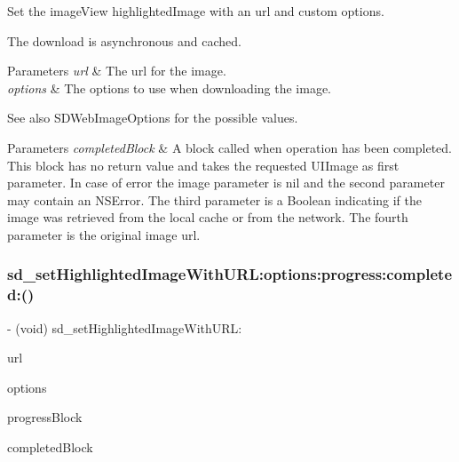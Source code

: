 Set the image\+View {\ttfamily highlighted\+Image} with an {\ttfamily url} and custom options.

The download is asynchronous and cached.


\begin{DoxyParams}{Parameters}
{\em url} & The url for the image. \\
\hline
{\em options} & The options to use when downloading the image. \\
\hline
\end{DoxyParams}
\begin{DoxySeeAlso}{See also}
S\+D\+Web\+Image\+Options for the possible values. 
\end{DoxySeeAlso}

\begin{DoxyParams}{Parameters}
{\em completed\+Block} & A block called when operation has been completed. This block has no return value and takes the requested U\+I\+Image as first parameter. In case of error the image parameter is nil and the second parameter may contain an N\+S\+Error. The third parameter is a Boolean indicating if the image was retrieved from the local cache or from the network. The fourth parameter is the original image url. \\
\hline
\end{DoxyParams}
\mbox{\label{category_u_i_image_view_07_highlighted_web_cache_08_a06bdae01c3cfc17896de4b8d3c33702d}} 
\subsubsection{\texorpdfstring{sd\+\_\+set\+Highlighted\+Image\+With\+U\+R\+L\+:options\+:progress\+:completed\+:()}{sd\_setHighlightedImageWithURL:options:progress:completed:()}\hspace{0.1cm}{\footnotesize\ttfamily [1/3]}}
{\footnotesize\ttfamily -\/ (void) sd\+\_\+set\+Highlighted\+Image\+With\+U\+R\+L\+: \begin{DoxyParamCaption}\item[{(N\+S\+U\+RL $\ast$)}]{url }\item[{options:(S\+D\+Web\+Image\+Options)}]{options }\item[{progress:(S\+D\+Web\+Image\+Downloader\+Progress\+Block)}]{progress\+Block }\item[{completed:(S\+D\+Web\+Image\+Completion\+Block)}]{completed\+Block }\end{DoxyParamCaption}}


